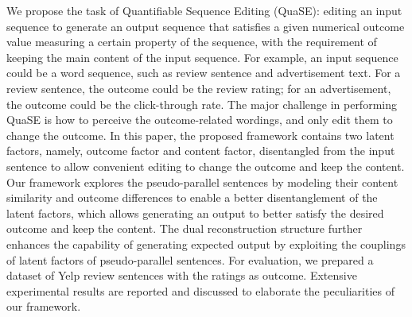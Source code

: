 We propose the task of Quantifiable Sequence Editing (QuaSE): editing an input sequence to generate an output sequence that satisfies a given numerical outcome value measuring a certain property of the sequence, with the requirement of keeping the main content of the input sequence. For example, an input sequence could be a word sequence, such as review sentence and advertisement text. For a review sentence, the outcome could be the review rating; for an advertisement, the outcome could be the click-through rate. The major challenge in performing QuaSE is how to perceive the outcome-related wordings, and only edit them to change the outcome. In this paper, the proposed framework contains two latent factors, namely, outcome factor and content factor, disentangled from the input sentence to allow convenient editing to change the outcome and keep the content. Our framework explores the pseudo-parallel sentences by modeling their content similarity and outcome differences to enable a better disentanglement of the latent factors, which allows generating an output to better satisfy the desired outcome and keep the content. The dual reconstruction structure further enhances the capability of generating expected output by exploiting the couplings of latent factors of pseudo-parallel sentences. For evaluation, we prepared a dataset of Yelp review sentences with the ratings as outcome. Extensive experimental results are reported and discussed to elaborate the peculiarities of our framework.
